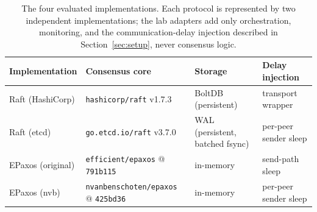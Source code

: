 \begin{table}[t]
\caption{The four evaluated implementations. Each protocol is represented by
two independent implementations; the lab adapters add only orchestration,
monitoring, and the communication-delay injection described in
Section~\ref{sec:setup}, never consensus logic.}
\label{tab:implementations}
\begin{tabular}{@{}lp{2.6cm}p{2.6cm}p{2.6cm}@{}}
\toprule
Implementation & Consensus core & Storage & Delay injection \\
\midrule
Raft (HashiCorp) & \texttt{hashicorp/raft} v1.7.3 & BoltDB (persistent) & transport wrapper \\
Raft (etcd) & \texttt{go.etcd.io/raft} v3.7.0 & WAL (persistent, batched fsync) & per-peer sender sleep \\
EPaxos (original) & \texttt{efficient/epaxos} @ \texttt{791b115} & in-memory & send-path sleep \\
EPaxos (nvb) & \texttt{nvanbenschoten/epaxos} @ \texttt{425bd36} & in-memory & per-peer sender sleep \\
\bottomrule
\end{tabular}
\end{table}